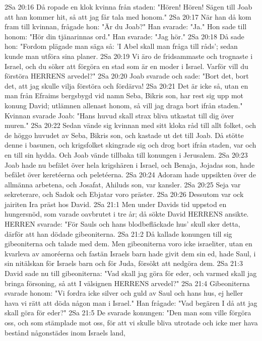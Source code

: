 2Sa 20:16  Då ropade en klok kvinna från staden: "Hören! Hören! Sägen till Joab att han kommer hit, så att jag får tala med honom."
2Sa 20:17  När han då kom fram till kvinnan, frågade hon: "Är du Joab?" Han svarade: "Ja." Hon sade till honom: "Hör din tjänarinnas ord." Han svarade: "Jag hör."
2Sa 20:18  Då sade hon: "Fordom plägade man säga så: 'I Abel skall man fråga till råds'; sedan kunde man utföra sina planer.
2Sa 20:19  Vi äro de fridsammaste och trognaste i Israel, och du söker att förgöra en stad som är en moder i Israel. Varför vill du förstöra HERRENS arvedel?"
2Sa 20:20  Joab svarade och sade: "Bort det, bort det, att jag skulle vilja förstöra och fördärva!
2Sa 20:21  Det är icke så, utan en man från Efraims bergsbygd vid namn Seba, Bikris son, har rest sig upp mot konung David; utlämnen allenast honom, så vill jag draga bort ifrån staden." Kvinnan svarade Joab: "Hans huvud skall strax bliva utkastat till dig över muren."
2Sa 20:22  Sedan vände sig kvinnan med sitt kloka råd till allt folket, och de höggo huvudet av Seba, Bikris son, och kastade ut det till Joab. Då stötte denne i basunen, och krigsfolket skingrade sig och drog bort ifrån staden, var och en till sin hydda. Och Joab vände tillbaka till konungen i Jerusalem.
2Sa 20:23  Joab hade nu befälet över hela krigshären i Israel, och Benaja, Jojadas son, hade befälet över keretéerna och peletéerna.
2Sa 20:24  Adoram hade uppsikten över de allmänna arbetena, och Josafat, Ahiluds son, var kansler.
2Sa 20:25  Seja var sekreterare, och Sadok och Ebjatar voro präster.
2Sa 20:26  Dessutom var ock jairiten Ira präst hos David.
2Sa 21:1  Men under Davids tid uppstod en hungersnöd, som varade oavbrutet i tre år; då sökte David HERRENS ansikte. HERREN svarade: "För Sauls och hans blodbefläckade hus' skull sker detta, därför att han dödade gibeoniterna.
2Sa 21:2  Då kallade konungen till sig gibeoniterna och talade med dem. Men gibeoniterna voro icke israeliter, utan en kvarleva av amoréerna och fastän Israels barn hade givit dem sin ed, hade Saul, i sin nitälskan för Israels barn och för Juda, försökt att nedgöra dem.
2Sa 21:3  David sade nu till gibeoniterna: "Vad skall jag göra för eder, och varmed skall jag bringa försoning, så att I välsignen HERRENS arvedel?"
2Sa 21:4  Gibeoniterna svarade honom: "Vi fordra icke silver och guld av Saul och hans hus, ej heller hava vi rätt att döda någon man i Israel." Han frågade: "Vad begären I då att jag skall göra för eder?"
2Sa 21:5  De svarade konungen: "Den man som ville förgöra oss, och som stämplade mot oss, för att vi skulle bliva utrotade och icke mer hava bestånd någonstädes inom Israels land,
